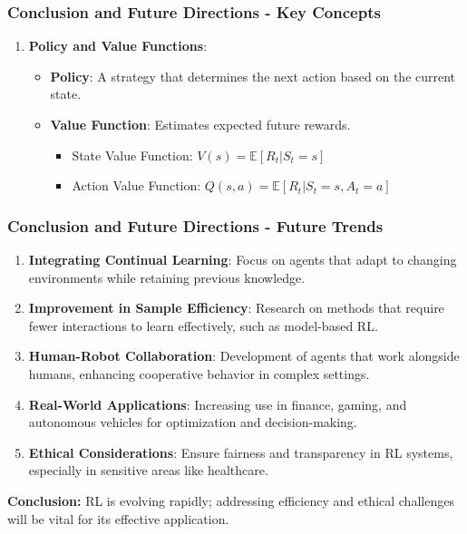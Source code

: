 \documentclass[aspectratio=169]{beamer}
\begin{document}
\begin{frame}[fragile]
    \frametitle{Conclusion and Future Directions - Key Concepts}
    
    \begin{enumerate}[resume]
        \item \textbf{Policy and Value Functions}:
        \begin{itemize}
            \item \textbf{Policy}: A strategy that determines the next action based on the current state.
            \item \textbf{Value Function}: Estimates expected future rewards.
            \begin{itemize}
                \item State Value Function: \( V(s) = \mathbb{E}[R_t | S_t = s] \)
                \item Action Value Function: \( Q(s, a) = \mathbb{E}[R_t | S_t = s, A_t = a] \)
            \end{itemize}
        \end{itemize}
    \end{enumerate}
\end{frame}

\begin{frame}[fragile]
    \frametitle{Conclusion and Future Directions - Future Trends}
    
    \begin{enumerate}
        \item \textbf{Integrating Continual Learning}: Focus on agents that adapt to changing environments while retaining previous knowledge.
        \item \textbf{Improvement in Sample Efficiency}: Research on methods that require fewer interactions to learn effectively, such as model-based RL.
        \item \textbf{Human-Robot Collaboration}: Development of agents that work alongside humans, enhancing cooperative behavior in complex settings.
        \item \textbf{Real-World Applications}: Increasing use in finance, gaming, and autonomous vehicles for optimization and decision-making.
        \item \textbf{Ethical Considerations}: Ensure fairness and transparency in RL systems, especially in sensitive areas like healthcare.
    \end{enumerate}
    
    \textbf{Conclusion:} RL is evolving rapidly; addressing efficiency and ethical challenges will be vital for its effective application.
\end{frame}
\end{document}
